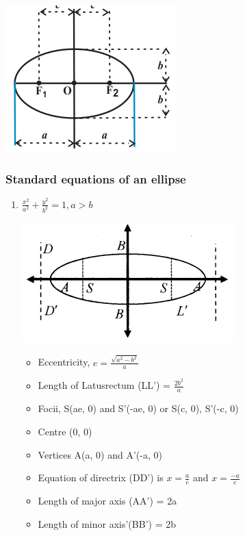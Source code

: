 \documentclass[12pt]{article}
\begin{document}
\begin{multicols}{2}
 

\begin{center}
    \includegraphics*[scale = 0.5]{f3.png}
\end{center}

\subsubsection*{Standard equations of an ellipse}
\begin{enumerate}
    \item $\frac{x^2}{a^2}+\frac{y^2}{b^2}=1,a>b$ \begin{center}
        \includegraphics*[scale=0.8]{5.png}
    \end{center}\begin{itemize}
        \item Eccentricity, $e = \frac{\sqrt{a^2-b^2}}{a}$
        \item Length of Latusrectum (LL’) = $\frac{2b^2}{a}$
        \item Focii, S(ae, 0) and S'(-ae, 0) or S(c, 0), S'(-c, 0)
        \item Centre (0, 0)
        \item Vertices A(a, 0) and A'(-a, 0)
        \item Equation of directrix (DD’) is $x = \frac{a}{e}$ and $x = \frac{-a}{e}$
        \item Length of major axis (AA’) = 2a
        \item Length of minor axis'(BB’) = 2b
    \end{itemize}


\end{enumerate}
\end{multicols}
\end{document}
